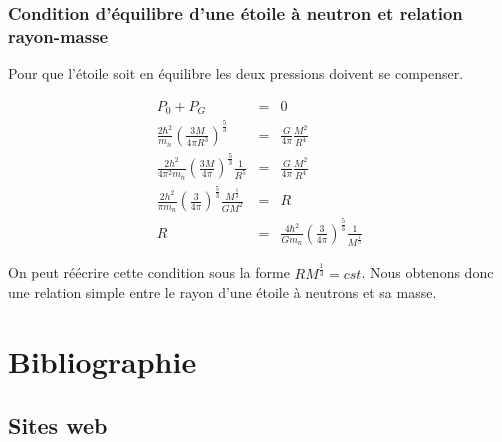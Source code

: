 \documentclass[11pt]{book} %
\begin{document}
\subsection{Condition d'équilibre d'une étoile à neutron et relation rayon-masse}
Pour que l'étoile soit en équilibre les deux pressions doivent se compenser.

\begin{eqnarray*}
    P_0+P_G&=&0\\
    \frac{2\hbar^2}{m_n}\left(\frac{3M}{4\pi R^3}\right)^{\frac{5}{3}}&=&\frac{G}{4\pi}\frac{M^2}{R^4}\\
    \frac{2h^2}{4\pi^2m_n}\left(\frac{3M}{4\pi}\right)^{\frac{5}{3}}\frac{1}{R^5}&=&\frac{G}{4\pi}\frac{M^2}{R^4}\\
    \frac{2h^2}{\pi m_n}\left(\frac{3}{4\pi}\right)^{\frac{5}{3}}\frac{M^{\frac{5}{3}}}{GM^2}&=&R\\
    R&=&\frac{4\hbar^2}{Gm_n}\left(\frac{3}{4\pi}\right)^{\frac{5}{3}}\frac{1}{M^{\frac{1}{3}}}
\end{eqnarray*}

On peut réécrire cette condition sous la forme \(RM^{\frac{1}{3}}=cst\). Nous obtenons donc une relation simple entre le rayon d'une étoile à neutrons et sa masse.


\chapter*{Bibliographie}
\section*{Sites web}
\printbibliography[heading=bibempty,type=other]


\cleardoublepage
{}
\setlength{\columnsep}{0.75cm}
\printindex

\end{document}
